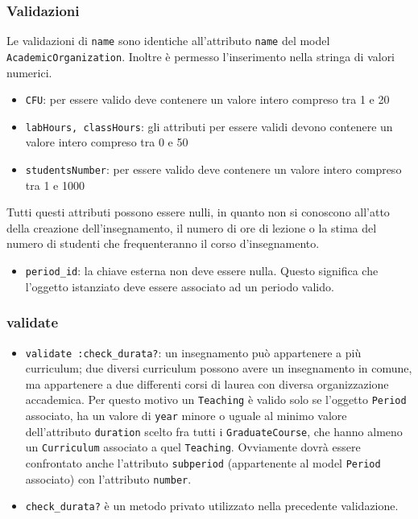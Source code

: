 \documentclass[11pt,a4paper]{article}
\begin{document}
\subsubsection*{Validazioni}
Le validazioni di \verb|name| sono identiche all'attributo \verb|name| del model \\ \verb|AcademicOrganization|. Inoltre è permesso l'inserimento nella stringa di valori numerici.
\begin{itemize}
 \item \verb|CFU|: per essere valido deve contenere un valore intero compreso tra 1 e 20
 \item \verb|labHours, classHours|: gli attributi per essere validi devono contenere un valore intero compreso tra 0 e 50
\item \verb|studentsNumber|: per essere valido deve contenere un valore intero compreso tra 1 e 1000
\end{itemize}
Tutti questi attributi possono essere nulli, in quanto non si conoscono all'atto della creazione dell'insegnamento, il numero di ore di lezione o la stima del numero di studenti che frequenteranno il corso d'insegnamento.
\begin{itemize}
 \item \verb|period_id|: la chiave esterna non deve essere nulla. Questo significa che l'oggetto istanziato deve essere associato ad un periodo valido.
\end{itemize}
\subsubsection*{validate}
\begin{itemize}
\item \verb|validate :check_durata?|: un insegnamento può appartenere a più curriculum; due diversi curriculum possono avere un insegnamento in comune, ma appartenere a due differenti corsi di laurea con diversa organizzazione accademica.
Per questo motivo un \verb|Teaching| è valido solo se l'oggetto \verb|Period| associato, ha un valore di \verb|year| minore o uguale al minimo valore dell'attributo \verb|duration| scelto fra tutti i \verb|GraduateCourse|, che hanno almeno un \verb|Curriculum| associato a quel \verb|Teaching|. Ovviamente dovrà essere confrontato anche l'attributo \verb|subperiod| (appartenente al model \verb|Period| associato) con l'attributo \verb|number|.
\item \verb|check_durata?| è un metodo privato utilizzato nella precedente validazione.
\end{itemize}
\end{document}

